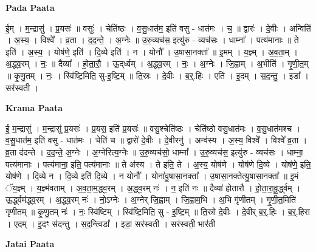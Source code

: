 \documentclass[17pt]{extarticle}
\begin{document}
\textbf{Pada Paata} \newline

ई॒म् । म॒न्द्रासु॑ । प्र॒यसः॑ ॥ वसुः॑ । चेति॑ष्ठः । व॒सु॒धात॑म॒ इति॑ वसु - धात॑मः । च॒ ॥ द्वारः॑ । दे॒वीः । अन्विति॑ । अ॒स्य॒ । विश्वे᳚ । व्र॒ता । द॒द॒न्ते॒ । अ॒ग्नेः ॥ उ॒रु॒व्यच॑स॒ इत्यु॑रु - व्यच॑सः । धाम्ना᳚ । पत्य॑मानाः ॥ ते इति॑ । अ॒स्य॒ । योष॑णे॒ इति॑ । दि॒व्ये इति॑ । न । योनौ᳚ । उ॒षासा॒नक्ता᳚ ॥ इ॒मम् । य॒ज्ञ्म् । अ॒व॒ता॒म् । अ॒द्ध्व॒रम् । नः॒ ॥ दैव्या᳚ । हो॒ता॒रौ॒ । ऊ॒द्‌र्ध्वम् । अ॒द्ध्व॒रम् । नः॒ । अ॒ग्नेः । जि॒ह्वाम् । अ॒भीति॑ । गृ॒णी॒त॒म् ॥ कृ॒णु॒तम् । नः॒ । स्वि॑ष्टि॒मिति॒ सु-इ॒ष्टि॒म् ॥ ति॒स्रः । दे॒वीः । ब॒र्॒.हिः । एति॑ । इ॒दम् । स॒द॒न्तु॒ । इडा᳚ । सर॑स्वती ।  \newline


\textbf{Krama Paata} \newline

ई॒ म॒न्द्रासु॑ । म॒न्द्रासु॑ प्र॒यसः॑ । प्र॒यस॒ इति॑ प्र॒यसः॑ ॥ वसु॒श्चेति॑ष्ठः । चेति॑ष्ठो वसु॒धात॑मः । व॒सु॒धात॑मश्च । व॒सु॒धात॑म॒ इति॑ वसु - धात॑मः । चेति॑ च ॥ द्वारो॑ दे॒वीः । दे॒वीरनु॑ । अन्व॑स्य । अ॒स्य॒ विश्वे᳚ । विश्वे᳚ व्र॒ता । व्र॒ता द॑दन्ते । द॒द॒न्ते॒ अ॒ग्नेः । अ॒ग्नेरित्य॒ग्नेः ॥ उ॒रु॒व्यच॑सो॒ धाम्ना᳚ । उ॒रु॒व्यच॑स॒ इत्यु॑रु - व्यच॑सः । धाम्ना॒ पत्य॑मानाः । पत्य॑माना॒ इति॒ पत्य॑मानाः ॥ ते अ॑स्य । ते इति॒ ते । अ॒स्य॒ योष॑णे । योष॑णे दि॒व्ये । योष॑णे॒ इति॒ योष॑णे । दि॒व्ये न । दि॒व्ये इति॑ दि॒व्ये । न योनौ᳚ । योना॑वु॒षासा॒नक्ता᳚ । उ॒षासा॒नक्तेत्यु॒षासा॒नक्ता᳚ ॥ इ॒मं ॅय॒ज्ञ्म् । य॒ज्ञ्म॑वताम् । अ॒व॒ता॒म॒द्ध्व॒रम् । अ॒द्ध्व॒रम् नः॑ । न॒ इति॑ नः ॥ दैव्या॑ होतारौ । हो॒ता॒रा॒वू॒र्द्ध्वम् । ऊ॒र्द्ध्वम॑द्ध्व॒रम् । अ॒द्ध्व॒रम् नः॑ । नो॒ऽग्नेः । अ॒ग्नेर् जि॒ह्वाम् । जि॒ह्वाम॒भि । अ॒भि गृ॑णीतम् । गृ॒णी॒त॒मिति॑ गृणीतम् ॥ कृ॒णु॒तम् नः॑ । नः॒ स्वि॑ष्टिम् । स्वि॑ष्टि॒मिति॒ सु - इ॒ष्टि॒म् ॥ ति॒स्रो दे॒वीः । दे॒वीर् ब॒र्॒.हिः । ब॒र्॒.हिरा । एदम् । इ॒दꣳ स॑दन्तु । स॒द॒न्त्विडा᳚ । इडा॒ सर॑स्वती । सर॑स्वती॒ भार॑ती \newline

\textbf{Jatai Paata} \newline
\end{document}
